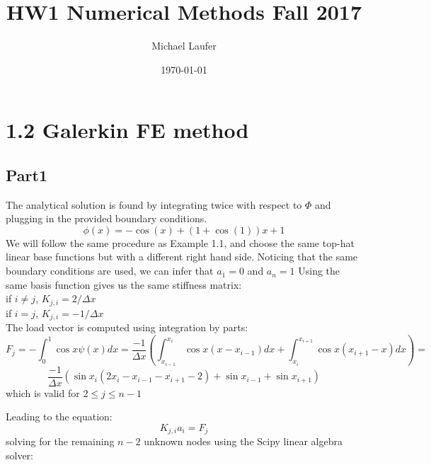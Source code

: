 \documentclass[11pt]{article}
\author{Michael Laufer}
\date{\today}
\title{HW1 Numerical Methods Fall 2017}
\begin{document}
\maketitle
\section{1.2 Galerkin FE method}
\label{sec:org881168f}
\subsection{Part1}
\label{sec:org6ce8ca2}
The analytical solution is found by integrating twice with respect to \(\Phi\) and plugging in the provided boundary conditions.
\[
\phi(x) = -\cos(x) + (1 + \cos(1))x +1
\]
We will follow the same procedure as Example 1.1, and choose the same top-hat linear base functions but with a different right hand side.
Noticing that the same boundary conditions are used, we can infer that \(a_{1}=0\) and \(a_{n}=1\)  
Using the same basis function gives us the same stiffness matrix: \\
if \(i\neq j\), \(K_{j,i} = 2 / \Delta x\) \\
if \(i=j\), \(K_{j,i} = -1 / \Delta x\) \\
The load vector is computed using integration by parts:
\[
F_{j}=-\int_{0}^{1} \cos x \psi(x)dx = \frac{-1}{\Delta x} \left(\int_{x_{i-1}}^{x_{i}} \cos x \left(x -x_{i-1} \right)dx + \int_{x_{i}}^{x_{i+1}} \cos x \left(x_{i+1} -x \right)dx \right) =
\]
\[
\frac{-1}{\Delta x} \left( \sin x_{i}(2x_{i}-x_{i-1}-x_{i+1} -2) + \sin x_{i-1} +\sin x_{i+1}\right)
\] 
which is valid for \(2 \leq j \leq n-1\)

Leading to the equation: 
\[
K_{j,i}a_{i}=F_{j}
\]
solving for the remaining \(n-2\) unknown nodes using the Scipy linear algebra solver:
\end{document}

